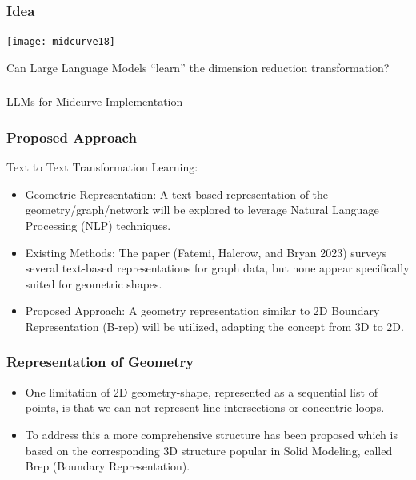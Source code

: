 \begin{frame}[fragile]\frametitle{Idea}
\begin{center}
\texttt{[image: midcurve18]}

Can Large Language Models ``learn'' the dimension reduction transformation?
\end{center}	
\end{frame}


\begin{frame}[fragile]\frametitle{}
\begin{center}
{\Large LLMs for Midcurve Implementation}
\end{center}
\end{frame}

\begin{frame}[fragile]\frametitle{Proposed Approach}

Text to Text Transformation Learning:

\begin{itemize}
\item Geometric Representation: A text-based representation of the geometry/graph/network will be explored to leverage Natural Language Processing (NLP) techniques.
\item Existing Methods: The paper (Fatemi, Halcrow, and Bryan 2023) surveys several text-based representations for graph data, but none appear specifically suited for geometric shapes.
\item Proposed Approach: A geometry representation similar to 2D Boundary Representation (B-rep) will be utilized, adapting the concept from 3D to 2D.
\end{itemize}	

\end{frame}

\begin{frame}[fragile]\frametitle{Representation of Geometry}


\begin{itemize}
\item One limitation of 2D geometry-shape, represented as a sequential list of points, is that we can not represent line intersections or concentric loops. 
\item To address this a more comprehensive structure has been proposed which is based on the corresponding 3D structure popular in Solid Modeling, called Brep (Boundary Representation).
\end{itemize}	

\end{frame}

